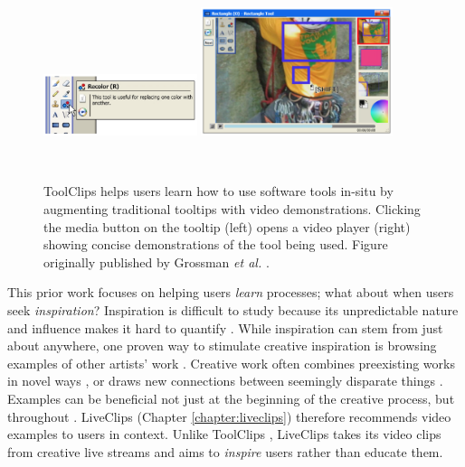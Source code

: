 \begin{figure}[t!]
\centering
  \includegraphics[width=0.4\textwidth]{figures/toolclips1.png}
  \includegraphics[width=0.5\textwidth]{figures/toolclips2.png}
  \caption[ToolClips helps users learn how to use software tools in-situ by augmenting traditional tooltips with video demonstrations. Figure originally published by Grossman \textit{et al.} \cite{Grossman2010a}.]{ToolClips helps users learn how to use software tools in-situ by augmenting traditional tooltips with video demonstrations. Clicking the media button on the tooltip (left) opens a video player (right) showing concise demonstrations of the tool being used. Figure originally published by Grossman \textit{et al.} \cite{Grossman2010a}.}~\label{fig:intro_toolclips}
\end{figure}

This prior work focuses on helping users \textit{learn} processes; what about when users seek \textit{inspiration}? Inspiration is difficult to study because its unpredictable nature and influence makes it hard to quantify \cite{Shneiderman2007}.
While inspiration can stem from just about anywhere, one proven way to stimulate creative inspiration is browsing examples of other artists' work \cite{Benjamin2014, Foster2003, Shneiderman2007, Shneiderman2002, Muller-Wienbergen2011, Greene2002, Bawden1986}. Creative work often combines preexisting works in novel ways \cite{Benjamin2014}, or draws new connections between seemingly disparate things \cite{Foster2003}. Examples can be beneficial not just at the beginning of the creative process, but throughout \cite{Kulkarni2014, Siangliulue2015, Rhodes1996}. LiveClips (Chapter \ref{chapter:liveclips}) therefore recommends video examples to users in context. Unlike ToolClips \cite{Grossman2010a}, LiveClips takes its video clips from creative live streams and aims to \textit{inspire} users rather than educate them.


